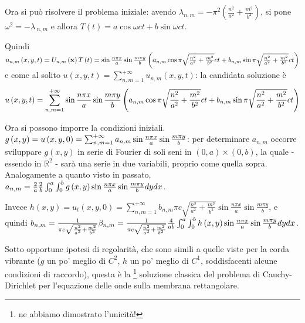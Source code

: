 \documentclass{article}
\begin{document}
Ora si pu\`{o} risolvere il problema iniziale: avendo $\lambda _{n,m}=-\pi
^{2}\left( \frac{n^{2}}{a^{2}}+\frac{m^{2}}{b^{2}}\right) $, si pone $\omega
^{2}=-\lambda \,_{n,m}$ e allora $T\left( t\right) =a\cos \omega ct+b\sin
\omega ct$.

Quindi $u_{n,m}\left( x,y,t\right) =U_{n,m}\left( \mathbf{x}\right) T\left(
t\right) =\sin \frac{n\pi x}{a}\sin \frac{m\pi y}{b}\left( a_{n,m}\cos \pi 
\sqrt{\frac{n^{2}}{a^{2}}+\frac{m^{2}}{b^{2}}}ct+b_{n,m}\sin \pi \sqrt{\frac{%
n^{2}}{a^{2}}+\frac{m^{2}}{b^{2}}}ct\right) $ e come al solito $u\left(
x,y,t\right) =\sum_{n,m=1}^{+\infty }u_{n,m}\left( x,y,t\right) $: la
candidata soluzione \`{e}%
\begin{equation*}
u\left( x,y,t\right) =\sum_{n,m=1}^{+\infty }\sin \frac{n\pi x}{a}\sin \frac{%
m\pi y}{b}\left( a_{n,m}\cos \pi \sqrt{\frac{n^{2}}{a^{2}}+\frac{m^{2}}{b^{2}%
}}ct+b_{n,m}\sin \pi \sqrt{\frac{n^{2}}{a^{2}}+\frac{m^{2}}{b^{2}}}ct\right)
\end{equation*}

Ora si possono imporre la condizioni iniziali. $g\left( x,y\right) =u\left(
x,y,0\right) =\sum_{n,m=1}^{+\infty }a_{n,m}\sin \frac{n\pi x}{a}\sin \frac{%
m\pi y}{b}$: per determinare $a_{n,m}$ occorre sviluppare $g\left(
x,y\right) $ in serie di Fourier di soli seni in $\left( 0,a\right) \times
\left( 0,b\right) $, la quale - essendo in $%
\mathbb{R}
^{2}$ - sar\`{a} una serie in due variabili, proprio come quella sopra.
Analogamente a quanto visto in passato, $a_{n,m}=\frac{2}{a}\frac{2}{b}%
\int_{0}^{a}\int_{0}^{b}g\left( x,y\right) \sin \frac{n\pi x}{a}\sin \frac{%
m\pi y}{b}dydx$.

Invece $h\left( x,y\right) =u_{t}\left( x,y,0\right) =\sum_{n,m=1}^{+\infty
}b_{n,m}\pi c\sqrt{\frac{n^{2}}{a^{2}}+\frac{m^{2}}{b^{2}}}\sin \frac{n\pi x%
}{a}\sin \frac{m\pi y}{b}$, e quindi $b_{n,m}=\frac{1}{\pi c\sqrt{\frac{n^{2}%
}{a^{2}}+\frac{m^{2}}{b^{2}}}}\beta _{n,m}=\frac{1}{\pi c\sqrt{\frac{n^{2}}{%
a^{2}}+\frac{m^{2}}{b^{2}}}}\frac{4}{ab}\int_{0}^{a}\int_{0}^{b}h\left(
x,y\right) \sin \frac{n\pi x}{a}\sin \frac{m\pi y}{b}dydx$.

Sotto opportune ipotesi di regolarit\`{a}, che sono simili a quelle viste
per la corda vibrante ($g$ un po' meglio di $C^{2}$, $h$ un po' meglio di $%
C^{1}$, soddisfacenti alcune condizioni di raccordo), questa \`{e} la%
\footnote{%
ne abbiamo dimostrato l'unicit\`{a}!} soluzione classica del problema di
Cauchy-Dirichlet per l'equazione delle onde sulla membrana rettangolare.
\end{document}
